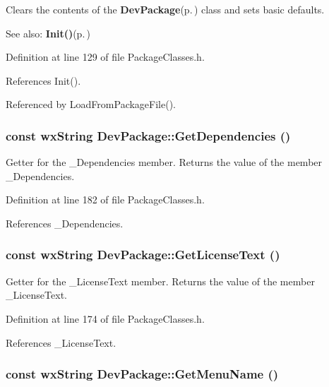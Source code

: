Clears the contents of the {\bf Dev\-Package}{\rm (p.\,\pageref{class_dev_package})} class and sets basic defaults. \begin{Desc}
\item[See also:]{\bf Init()}{\rm (p.\,\pageref{class_dev_package_2dc9c10c045fa1b172d1c5bad4cd4298})} \end{Desc}


Definition at line 129 of file Package\-Classes.h.

References Init().

Referenced by Load\-From\-Package\-File().
\subsubsection{\setlength{\rightskip}{0pt plus 5cm}const wx\-String Dev\-Package::Get\-Dependencies ()\hspace{0.3cm}{\tt  [inline]}}\label{class_dev_package_a10ecf4fbb2c116b241cb3ca375b071e}


Getter for the \_\-Dependencies member. Returns the value of the member \_\-Dependencies. 

Definition at line 182 of file Package\-Classes.h.

References \_\-Dependencies.
\subsubsection{\setlength{\rightskip}{0pt plus 5cm}const wx\-String Dev\-Package::Get\-License\-Text ()\hspace{0.3cm}{\tt  [inline]}}\label{class_dev_package_3370535c8237ef56575c211c0da79253}


Getter for the \_\-License\-Text member. Returns the value of the member \_\-License\-Text. 

Definition at line 174 of file Package\-Classes.h.

References \_\-License\-Text.
\subsubsection{\setlength{\rightskip}{0pt plus 5cm}const wx\-String Dev\-Package::Get\-Menu\-Name ()\hspace{0.3cm}{\tt  [inline]}}\label{class_dev_package_4a1104ccb80f91e9d8cc505fecc3d040}



